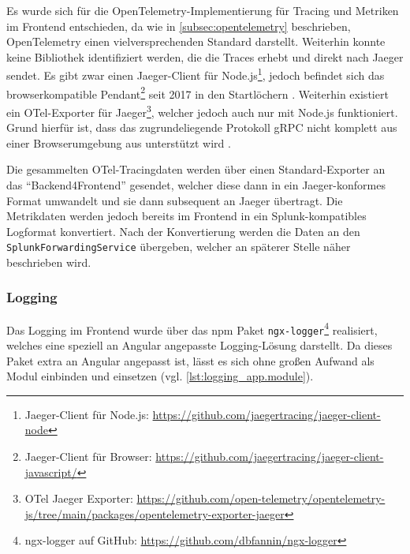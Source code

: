 Es wurde sich für die OpenTelemetry-Implementierung für Tracing und Metriken im Frontend entschieden, da wie in \autoref{subsec:opentelemetry} beschrieben, OpenTelemetry einen vielversprechenden Standard darstellt. Weiterhin konnte keine Bibliothek identifiziert werden, die die Traces erhebt und direkt nach Jaeger sendet. Es gibt zwar einen Jaeger-Client für Node.js\footnote{Jaeger-Client für Node.js: \url{https://github.com/jaegertracing/jaeger-client-node}}, jedoch befindet sich das browserkompatible Pendant\footnote{Jaeger-Client für Browser: \url{https://github.com/jaegertracing/jaeger-client-javascript/}} seit 2017 in den Startlöchern \cite{JaegerJSClientUsageInABrowser}. Weiterhin existiert ein OTel-Exporter für Jaeger\footnote{OTel Jaeger Exporter: \url{https://github.com/open-telemetry/opentelemetry-js/tree/main/packages/opentelemetry-exporter-jaeger}}, welcher jedoch auch nur mit Node.js funktioniert. Grund hierfür ist, dass das zugrundeliegende Protokoll gRPC \cite{grpc} nicht komplett aus einer Browserumgebung aus unterstützt wird \cite{grpcWebLimitations}.


Die gesammelten OTel-Tracingdaten werden über einen Standard-Exporter an das \enquote{Backend4Frontend} gesendet, welcher diese dann in ein Jaeger-konformes Format umwandelt und sie dann subsequent an Jaeger übertragt. Die Metrikdaten werden jedoch bereits im Frontend in ein Splunk-kompatibles Logformat konvertiert. Nach der Konvertierung werden die Daten an den \texttt{SplunkForwardingService} übergeben, welcher an späterer Stelle näher beschrieben wird.

\subsubsection{Logging}

Das Logging im Frontend wurde über das npm \cite{NPM} Paket \texttt{ngx-logger}\footnote{ngx-logger auf GitHub: \url{https://github.com/dbfannin/ngx-logger}} realisiert, welches eine speziell an Angular angepasste Logging-Lösung darstellt. Da dieses Paket extra an Angular angepasst ist, lässt es sich ohne großen Aufwand als Modul einbinden und einsetzen (vgl. \autoref{lst:logging_app.module}).



